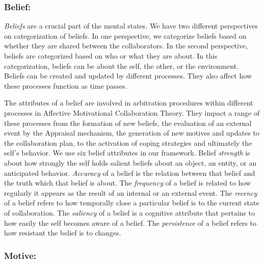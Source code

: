 \documentclass{aamas2016}
\begin{document}
\subsubsection{Belief:}
\label{sec:belief}

\textit{Beliefs} are a crucial part of the mental states. We have two different
perspectives on categorization of beliefs. In one perspective, we categorize
beliefs based on whether they are shared between the collaborators. In the
second perspective, beliefs are categorized based on who or what they are about.
In this categorization, beliefs can be about the self, the other, or the
environment. Beliefs can be created and updated by different processes. They
also affect how these processes function as time passes.

The attributes of a belief are involved in arbitration procedures within
different processes in Affective Motivational Collaboration Theory. They impact
a range of these processes from the formation of new beliefs, the evaluation of
an external event by the Appraisal mechanism, the generation of new motives and
updates to the collaboration plan, to the activation of coping strategies and
ultimately the self's behavior. We use six belief attributes in our framework.
Belief \textit{strength} is about how strongly the self holds salient beliefs
about an object, an entity, or an anticipated behavior. \textit{Accuracy} of a
belief is the relation between that belief and the truth which that belief is
about. The \textit{frequency} of a belief is related to how regularly it appears
as the result of an internal or an external event. The \textit{recency} of a
belief refers to how temporally close a particular belief is to the current
state of collaboration. The \textit{saliency} of a belief is a cognitive
attribute that pertains to how easily the self becomes aware of a belief. The
\textit{persistence} of a belief refers to how resistant the belief is to
changes.

\subsubsection{Motive:}
\label{sec:motive}
\end{document}
